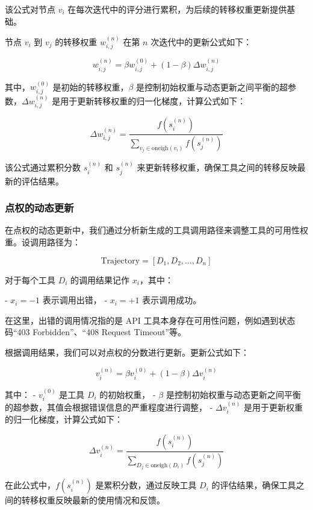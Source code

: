 该公式对节点 \( v_i \) 在每次迭代中的评分进行累积，为后续的转移权重更新提供基础。

节点 \( v_i \) 到 \( v_j \) 的转移权重 \( w_{i,j}^{(n)} \) 在第 \( n \) 次迭代中的更新公式如下：

\[
w_{i,j}^{(n)} = \beta w_{i,j}^{(0)} + (1 - \beta) \Delta w_{i,j}^{(n)}
\]

其中，\( w_{i,j}^{(0)} \) 是初始的转移权重，\( \beta \) 是控制初始权重与动态更新之间平衡的超参数，\( \Delta w_{i,j}^{(n)} \) 是用于更新转移权重的归一化梯度，计算公式如下：

\[
\Delta w_{i,j}^{(n)} = \frac{f(s_i^{(n)})}{\sum_{v_j \in \text{oneigh}(v_i)} f(s_j^{(n)})}
\]

该公式通过累积分数 \( s_i^{(n)} \) 和 \( s_j^{(n)} \) 来更新转移权重，确保工具之间的转移反映最新的评估结果。

\subsubsection{点权的动态更新}

在点权的动态更新中，我们通过分析新生成的工具调用路径来调整工具的可用性权重。设调用路径为：

\[
\text{Trajectory} = [D_1, D_2, \ldots, D_n]
\]

对于每个工具 \( D_i \) 的调用结果记作 \( x_i \)，其中：

- \( x_i = -1 \) 表示调用出错，
- \( x_i = +1 \) 表示调用成功。

在这里，出错的调用情况指的是 API 工具本身存在可用性问题，例如遇到状态码“403 Forbidden”、“408 Request Timeout”等。

根据调用结果，我们可以对点权的分数进行更新。更新公式如下：

\[
v_i^{(n)} = \beta v_i^{(0)} + (1 - \beta) \Delta v_i^{(n)}
\]

其中：
- \( v_i^{(0)} \) 是工具 \( D_i \) 的初始权重，
- \( \beta \) 是控制初始权重与动态更新之间平衡的超参数，其值会根据错误信息的严重程度进行调整，
- \( \Delta v_i^{(n)} \) 是用于更新权重的归一化梯度，计算公式如下：

\[
\Delta v_i^{(n)} = \frac{f(s_i^{(n)})}{\sum_{D_j \in \text{oneigh}(D_i)} f(s_j^{(n)})}
\]

在此公式中，$f(s_i^{(n)})$ 是累积分数，通过反映工具 \( D_i \) 的评估结果，确保工具之间的转移权重反映最新的使用情况和反馈。


